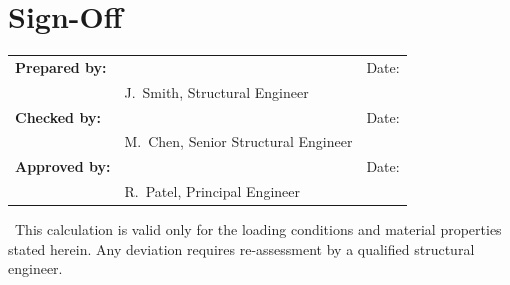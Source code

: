 \section{Sign-Off}
\vspace{4pt}
\begin{tcolorbox}[
  colback=primlight,
  colframe=primary,
  arc=0mm,
  boxrule=0.8pt,
  left=10mm,
  right=10mm,
  top=8mm,
  bottom=8mm,
]
  \begin{tabularx}{\linewidth}{@{}>{\color{dkgray}\bfseries}lXl@{}}
    Prepared by: & \dotfill & Date: \dotfill \\[10pt]
    & {\footnotesize\color{dkgray}J.\ Smith, Structural Engineer} & \\[16pt]
    Checked by:  & \dotfill & Date: \dotfill \\[10pt]
    & {\footnotesize\color{dkgray}M.\ Chen, Senior Structural Engineer} & \\[16pt]
    Approved by: & \dotfill & Date: \dotfill \\[10pt]
    & {\footnotesize\color{dkgray}R.\ Patel, Principal Engineer} & \\
  \end{tabularx}
\end{tcolorbox}

\bigskip
{\footnotesize\color{dkgray}\faExclamationTriangle\ This calculation is valid only for the loading conditions and material properties stated herein. Any deviation requires re-assessment by a qualified structural engineer.}
